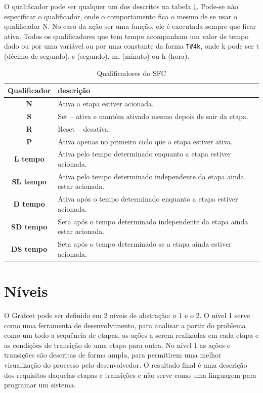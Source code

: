 O qualificador pode ser qualquer um dos descritos na tabela \ref{tab:qualiSFC}. Pode-se não especificar o qualificador, onde o comportamento fica o mesmo de se usar o qualificador N. No caso da ação ser uma função, ele é executada sempre que ficar ativa. Todos os qualificadores que tem tempo acompanham um valor de tempo dado ou por uma variável ou por uma constante da forma \lstinline|T#4k|, onde k pode ser t (décimo de segundo), s (segundo), m, (minuto) ou h (hora).
\begin{table}[hbt]
  \caption{Qualificadores do SFC}
  \label{tab:qualiSFC}
  \centering

  \begin{tabularx}{\textwidth}{|c|X|}
  \hline

  \hline
  \textbf{Qualificador} & \textbf{descrição}\\
  \hline
   \textbf{N}  & Ativa a etapa estiver acionada. \\
   \textbf{S}  & Set -- ativa e mantém ativado mesmo depois de sair da etapa. \\
   \textbf{R}  & Reset -- desativa. \\
   \textbf{P}  & Ativa apenas no primeiro ciclo que a etapa estiver ativa. \\
   \textbf{L tempo}  & Ativa pelo tempo determinado enquanto a etapa estiver acionada.\\
   \textbf{SL tempo}  & Ativa pelo tempo determinado independente da etapa ainda estar acionada.\\
   \textbf{D tempo}  & Ativa após o tempo determinado enquanto a etapa estiver acionada.\\
   \textbf{SD tempo}  & Seta após o tempo determinado independente da etapa ainda estar acionada.\\
   \textbf{DS tempo}  & Seta após o tempo determinado se a etapa ainda estiver acionada.\\
  \hline

  \hline
  \end{tabularx}
\end{table}

\clearpage
\section{Níveis}
O Grafcet pode ser definido em 2 níveis de abstração: o 1 e o 2. O nível 1 serve como uma ferramenta de desenvolvimento, para analisar a partir do problema como um todo a sequência de etapas, as ações a serem realizadas em cada etapa e as condições de transição de uma etapa para outra. No nível 1 as ações e transições são descritas de forma ampla, para permitirem uma melhor visualização do processo pelo desenvolvedor. O resultado final é uma descrição dos requisitos daquelas etapas e transições e não serve como uma linguagem para programar um sistema.

